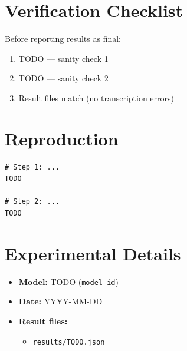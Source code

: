 \documentclass[11pt]{article}
\begin{document}
\section{Verification Checklist}
\label{sec:verification}


Before reporting results as final:

\begin{enumerate}
  \item[$\square$] TODO --- sanity check 1
  \item[$\square$] TODO --- sanity check 2
  \item[$\square$] Result files match (no transcription errors)
\end{enumerate}

\section{Reproduction}
\label{sec:reproduction}


\begin{verbatim}
# Step 1: ...
TODO

# Step 2: ...
TODO
\end{verbatim}

\section{Experimental Details}
\label{sec:details}

\begin{itemize}
  \item \textbf{Model:} TODO (\texttt{model-id})
  \item \textbf{Date:} YYYY-MM-DD
  \item \textbf{Result files:}
    \begin{itemize}
      \item \texttt{results/TODO.json}
    \end{itemize}
\end{itemize}
\end{document}
